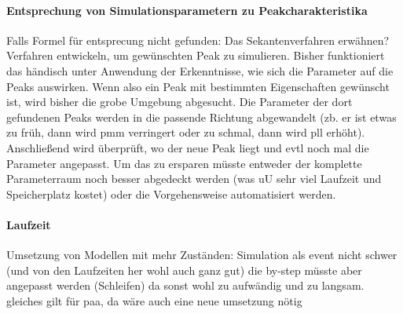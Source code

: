 % 
% 
% 


\paragraph{Entsprechung von Simulationsparametern zu Peakcharakteristika}
Falls Formel für entsprecung nicht gefunden: Das Sekantenverfahren erwähnen?
Verfahren entwickeln, um gewünschten Peak zu simulieren. Bisher funktioniert das händisch unter Anwendung der Erkenntnisse, wie sich die Parameter auf die Peaks auswirken. Wenn also ein Peak mit bestimmten Eigenschaften gewünscht ist, wird bisher die grobe Umgebung abgesucht. Die Parameter der dort gefundenen Peaks werden in die passende Richtung abgewandelt (zb. er ist etwas zu früh, dann wird pmm verringert oder zu schmal, dann wird pll erhöht). Anschließend wird überprüft, wo der neue Peak liegt und evtl noch mal die Parameter angepasst. 
Um das zu ersparen müsste entweder der komplette Parameterraum noch besser abgedeckt werden (was uU sehr viel Laufzeit und Speicherplatz kostet) oder die Vorgehensweise automatisiert werden.

\paragraph{Laufzeit}

Umsetzung von Modellen mit mehr Zuständen: Simulation als event nicht schwer (und von den Laufzeiten her wohl auch ganz gut) die by-step müsste aber angepasst werden (Schleifen) da sonst wohl zu aufwändig und zu langsam. gleiches gilt für paa, da wäre auch eine neue umsetzung nötig
